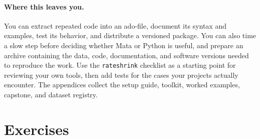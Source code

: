 \documentclass[
    a4paper,
    fontsize=10pt,
    twoside=true,
    numbers=noenddot,
]{kaobook}
\begin{document}
\paragraph{Where this leaves you.} You can extract repeated code into an ado-file, document its syntax and examples, test its behavior, and distribute a versioned package. You can also time a slow step before deciding whether Mata or Python is useful, and prepare an archive containing the data, code, documentation, and software versions needed to reproduce the work. Use the \texttt{rateshrink} checklist as a starting point for reviewing your own tools, then add tests for the cases your projects actually encounter. The appendices collect the setup guide, toolkit, worked examples, capstone, and dataset registry.

\section*{Exercises}
\end{document}
